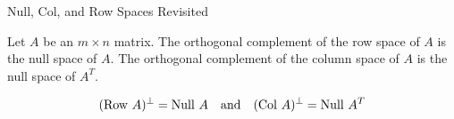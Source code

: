 \documentclass[xcolor=dvipsnames,aspectratio=169,t]{beamer}
\begin{document}
\begin{frame}{Null, Col, and Row Spaces Revisited}
  \begin{theorem}
  Let $A$ be an $m \times n$ matrix. The orthogonal complement of the row space of $A$ is the null space of $A$. The orthogonal complement of the column space of $A$ is the null space of $A^T$.
  \vspace*{-.8em}
  
  \[ (\mbox{Row } A)^{\perp} = \mbox{Null } A \quad \mbox{and} \quad (\mbox{Col } A)^{\perp} = \mbox{Null } A^T\]
  \end{theorem}
  \medskip

  

\end{frame}
\end{document}
